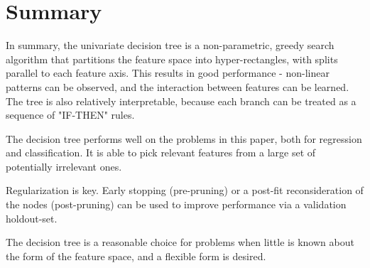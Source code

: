 \documentclass{amsart}
\begin{document}
    \section{Summary}
    In summary, the univariate decision tree is a non-parametric, greedy search algorithm
    that partitions the feature space into hyper-rectangles, with splits
    parallel to each feature axis. This results in good performance - non-linear
    patterns can be observed, and the interaction between features can be learned.
    The tree is also relatively interpretable, because each branch
    can be treated as a sequence of "IF-THEN" rules.

    The decision tree performs well on the problems in this paper, both for regression
    and classification. It is able to pick relevant features from a large set of
    potentially irrelevant ones.

    Regularization is key. Early stopping (pre-pruning) or a post-fit reconsideration
    of the nodes (post-pruning) can be used to improve performance via a
    validation holdout-set.

    The decision tree is a reasonable choice for problems when little is known about
    the form of the feature space, and a flexible form is desired.












\end{document}
